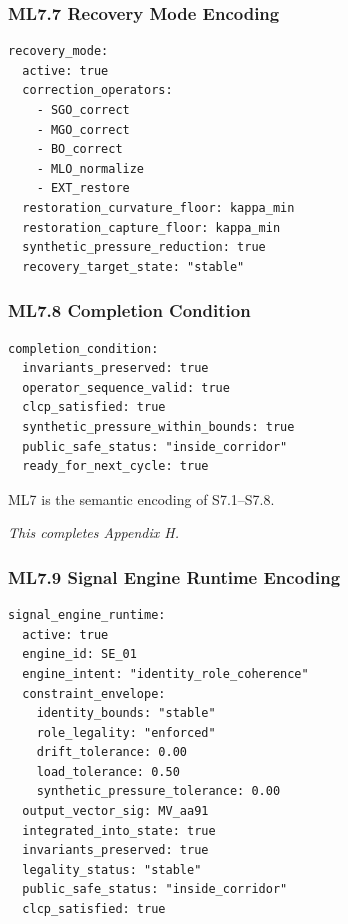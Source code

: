 
\subsubsection*{ML7.7 Recovery Mode Encoding}

\begin{verbatim}
recovery_mode:
  active: true
  correction_operators:
    - SGO_correct
    - MGO_correct
    - BO_correct
    - MLO_normalize
    - EXT_restore
  restoration_curvature_floor: kappa_min
  restoration_capture_floor: kappa_min
  synthetic_pressure_reduction: true
  recovery_target_state: "stable"
\end{verbatim}


\subsubsection*{ML7.8 Completion Condition}

\begin{verbatim}
completion_condition:
  invariants_preserved: true
  operator_sequence_valid: true
  clcp_satisfied: true
  synthetic_pressure_within_bounds: true
  public_safe_status: "inside_corridor"
  ready_for_next_cycle: true
\end{verbatim}

ML7 is the semantic encoding of S7.1–S7.8.

\medskip
\noindent\textit{This completes Appendix H.}


\subsubsection*{ML7.9 Signal Engine Runtime Encoding}

\begin{verbatim}
signal_engine_runtime:
  active: true
  engine_id: SE_01
  engine_intent: "identity_role_coherence"
  constraint_envelope:
    identity_bounds: "stable"
    role_legality: "enforced"
    drift_tolerance: 0.00
    load_tolerance: 0.50
    synthetic_pressure_tolerance: 0.00
  output_vector_sig: MV_aa91
  integrated_into_state: true
  invariants_preserved: true
  legality_status: "stable"
  public_safe_status: "inside_corridor"
  clcp_satisfied: true
\end{verbatim}

